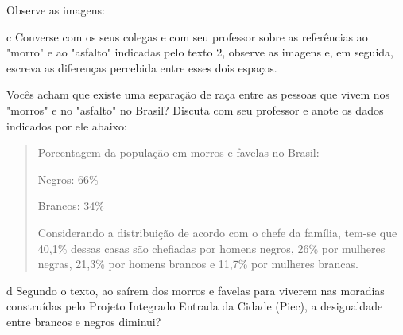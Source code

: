 Observe as imagens:




\num{c} Converse com os seus colegas e com seu professor sobre as referências ao
"morro" e ao "asfalto" indicadas pelo texto 2, observe as imagens e, em
seguida, escreva as diferenças percebida entre esses dois espaços.


Vocês acham que existe uma separação de raça entre as pessoas que vivem
nos "morros" e no "asfalto" no Brasil? Discuta com seu professor e anote
os dados indicados por ele abaixo:

\begin{quote}
Porcentagem da população em morros e favelas no Brasil:

Negros: 66\%

Brancos: 34\%

Considerando a distribuição de acordo com o chefe da família, tem-se que
40,1\% dessas casas são chefiadas por homens negros, 26\% por mulheres
negras, 21,3\% por homens brancos e 11,7\% por mulheres brancas.
\end{quote}

\num{d} Segundo o texto, ao saírem dos morros e favelas para viverem nas
moradias construídas pelo Projeto Integrado Entrada da Cidade (Piec), a
desigualdade entre brancos e negros diminui?



